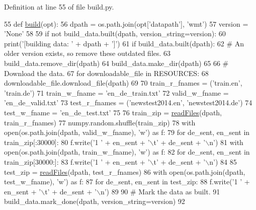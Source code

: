 Definition at line 55 of file build.\+py.


\begin{DoxyCode}
55 \textcolor{keyword}{def }\hyperlink{namespacedialog__babi__feedback_1_1build_a7a9d289f7493a5ded13c4b7f071b6184}{build}(opt):
56     dpath = os.path.join(opt[\textcolor{stringliteral}{'datapath'}], \textcolor{stringliteral}{'wmt'})
57     version = \textcolor{stringliteral}{'None'}
58 
59     \textcolor{keywordflow}{if} \textcolor{keywordflow}{not} build\_data.built(dpath, version\_string=version):
60         print(\textcolor{stringliteral}{'[building data: '} + dpath + \textcolor{stringliteral}{']'})
61         \textcolor{keywordflow}{if} build\_data.built(dpath):
62             \textcolor{comment}{# An older version exists, so remove these outdated files.}
63             build\_data.remove\_dir(dpath)
64         build\_data.make\_dir(dpath)
65 
66         \textcolor{comment}{# Download the data.}
67         \textcolor{keywordflow}{for} downloadable\_file \textcolor{keywordflow}{in} RESOURCES:
68             downloadable\_file.download\_file(dpath)
69 
70         train\_r\_fnames = (\textcolor{stringliteral}{'train.en'}, \textcolor{stringliteral}{'train.de'})
71         train\_w\_fname = \textcolor{stringliteral}{'en\_de\_train.txt'}
72         valid\_w\_fname = \textcolor{stringliteral}{'en\_de\_valid.txt'}
73         test\_r\_fnames = (\textcolor{stringliteral}{'newstest2014.en'}, \textcolor{stringliteral}{'newstest2014.de'})
74         test\_w\_fname = \textcolor{stringliteral}{'en\_de\_test.txt'}
75 
76         train\_zip = \hyperlink{namespaceparlai_1_1tasks_1_1wmt_1_1build_a192eab3c7b1241809a1c134d54a9933f}{readFiles}(dpath, train\_r\_fnames)
77         numpy.random.shuffle(train\_zip)
78         with open(os.path.join(dpath, valid\_w\_fname), \textcolor{stringliteral}{'w'}) \textcolor{keyword}{as} f:
79             \textcolor{keywordflow}{for} de\_sent, en\_sent \textcolor{keywordflow}{in} train\_zip[:30000]:
80                 f.write(\textcolor{stringliteral}{'1 '} + en\_sent + \textcolor{stringliteral}{'\(\backslash\)t'} + de\_sent + \textcolor{stringliteral}{'\(\backslash\)n'})
81         with open(os.path.join(dpath, train\_w\_fname), \textcolor{stringliteral}{'w'}) \textcolor{keyword}{as} f:
82             \textcolor{keywordflow}{for} de\_sent, en\_sent \textcolor{keywordflow}{in} train\_zip[30000:]:
83                 f.write(\textcolor{stringliteral}{'1 '} + en\_sent + \textcolor{stringliteral}{'\(\backslash\)t'} + de\_sent + \textcolor{stringliteral}{'\(\backslash\)n'})
84 
85         test\_zip = \hyperlink{namespaceparlai_1_1tasks_1_1wmt_1_1build_a192eab3c7b1241809a1c134d54a9933f}{readFiles}(dpath, test\_r\_fnames)
86         with open(os.path.join(dpath, test\_w\_fname), \textcolor{stringliteral}{'w'}) \textcolor{keyword}{as} f:
87             \textcolor{keywordflow}{for} de\_sent, en\_sent \textcolor{keywordflow}{in} test\_zip:
88                 f.write(\textcolor{stringliteral}{'1 '} + en\_sent + \textcolor{stringliteral}{'\(\backslash\)t'} + de\_sent + \textcolor{stringliteral}{'\(\backslash\)n'})
89 
90         \textcolor{comment}{# Mark the data as built.}
91         build\_data.mark\_done(dpath, version\_string=version)
92 \end{DoxyCode}
